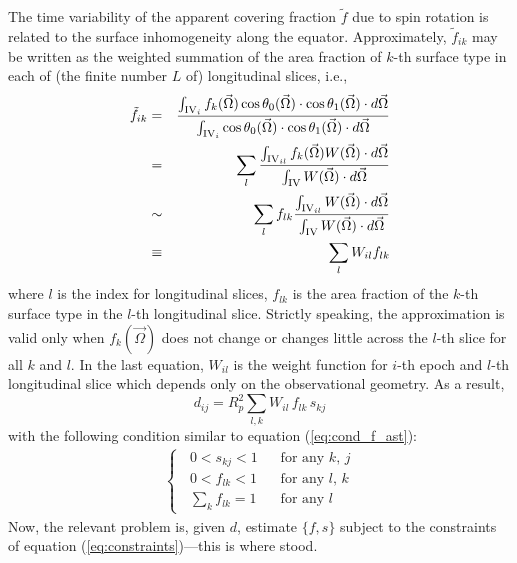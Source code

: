 \documentclass[iop,numberedappendix,apj,]{emulateapj}
\def\fast{\tilde f}
\begin{document}
The time variability of the apparent covering fraction $\fast $ due to spin rotation is related to the surface inhomogeneity along the equator. Approximately, $\fast _{ik}$ may be written as the weighted summation of the area fraction of $k$-th surface type in each of (the finite number $L$ of) longitudinal slices, i.e.,
\begin{eqnarray}
\fast _{ik} &=& \frac{ \int_{{\rm IV}_{i}} f_k (\vec \Omega ) \cos \theta_0 ({\vec \Omega}) \cdot \cos \theta_1 ({\vec \Omega}) \cdot d\vec \Omega }{ \int_{{\rm IV}_i}  \cos \theta_0 ({\vec \Omega}) \cdot \cos \theta_1 ({\vec \Omega}) \cdot d\vec \Omega }  \\
&=& \sum_l \frac{ \int_{{\rm IV}_{il}}  f_k (\vec \Omega ) W (\vec \Omega  ) \cdot d\vec \Omega }{ \int_{{\rm IV}}  W (\vec \Omega ) \cdot d\vec \Omega } \\
&\sim & \sum_l f_{lk} \frac{ \int_{{\rm IV}_{il}} W (\vec \Omega ) \cdot d\vec \Omega }{ \int_{{\rm IV}}  W (\vec \Omega ) \cdot d\vec \Omega } \label{eq:discretize}\\
&\equiv & \sum_l  W_{il} f_{lk} \label{eq:Wf}
\end{eqnarray}
where $l$ is the index for longitudinal slices, $f_{lk}$ is the area fraction of the $k$-th surface type in the $l$-th longitudinal slice. 
Strictly speaking, the approximation is valid only when $f_k(\vec \Omega)$ does not change or changes little across the $l$-th slice for all $k$ and $l$. 
In the last equation, $W_{il}$ is the weight function for $i$-th epoch and $l$-th longitudinal slice which depends only on the observational geometry. 
As a result,
\begin{equation}
d_{ij} = R_p^2 \sum _{l,k} W_{il} \, f_{lk} \, s_{kj} \label{eq:d_f_s}
\end{equation}
with the following condition similar to equation (\ref{eq:cond_f_ast}):
\begin{eqnarray}
\begin{cases}
\;\; 0 < s_{kj} < 1 \;\;\; & \mbox{for any $k$, $j$} \\
\;\; 0 < f_{lk} < 1 \;\;\; & \mbox{for any $l$, $k$} \label{eq:cond_f} \\
\;\; \sum_k f_{lk} = 1 & \mbox{for any $l$} 
\end{cases}
\label{eq:constraints}
\end{eqnarray}
Now, the relevant problem is, given $d$, estimate $\{f, s\}$ subject to the constraints of equation (\ref{eq:constraints})---this is where \citet{Cowan2013} stood. 
\end{document}
